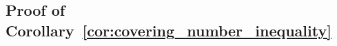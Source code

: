 \documentclass[letterpaper]{article} %
\newcommand{\probdistri}{\mathbf{p}}
\newcommand{\pair}[1]{(#1)}
\newcommand{\bmlambda}{\bm{\lambda}}
\newcommand{\citep}[3]{(#1\ \citeauthor{#3}\ \citeyear{#3},\ #2)}
\begin{document}

\subsection{Proof of Corollary~\ref{cor:covering_number_inequality}} %
\label{sub:proof_of_corollary_}
\end{document}

